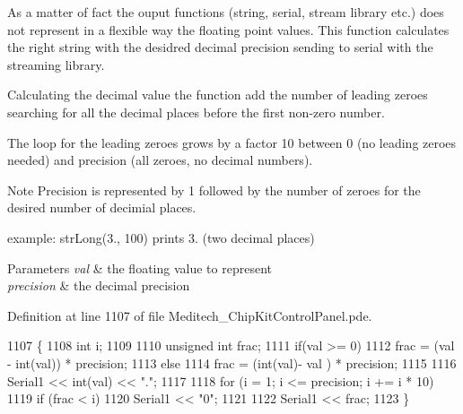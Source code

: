 \begin{DoxyCode}
\begin{DoxyCode}
\begin{DoxyCode}
\begin{DoxyCode}
As a matter of fact the ouput functions (string, serial, stream library etc.) does not represent in a flexible way the floating point values. This function calculates the right string with the desidred decimal precision sending to serial with the streaming library.

Calculating the decimal value the function add the number of leading zeroes searching for all the decimal places before the first non-\/zero number.

The loop for the leading zeroes grows by a factor 10 between 0 (no leading zeroes needed) and precision (all zeroes, no decimal numbers).

\begin{DoxyNote}{Note}
Precision is represented by 1 followed by the number of zeroes for the desired number of decimial places. \par
example\-: str\-Long(3., 100) prints 3. (two decimal places)
\end{DoxyNote}

\begin{DoxyParams}{Parameters}
{\em val} & the floating value to represent \\
\hline
{\em precision} & the decimal precision \\
\hline
\end{DoxyParams}


Definition at line 1107 of file Meditech\-\_\-\-Chip\-Kit\-Control\-Panel.\-pde.


\begin{DoxyCode}
1107                                                  \{
1108     \textcolor{keywordtype}{int} i;
1109     
1110     \textcolor{keywordtype}{unsigned} \textcolor{keywordtype}{int} frac;
1111     \textcolor{keywordflow}{if}(val >= 0)
1112       frac = (val - int(val)) * precision;
1113     \textcolor{keywordflow}{else}
1114       frac = (int(val)- val ) * precision;
1115 
1116     Serial1 << int(val) << \textcolor{stringliteral}{"."};
1117 
1118     \textcolor{keywordflow}{for} (i = 1; i <= precision; i += i * 10)
1119         \textcolor{keywordflow}{if} (frac < i)
1120             Serial1 << \textcolor{stringliteral}{"0"};
1121 
1122     Serial1 << frac;
1123 \}
\end{DoxyCode}
\hypertarget{_meditech___chip_kit_control_panel_8pde_a586164a6eff90eab6ba87a6ca123770d}{
}
\end{DoxyCode}
\end{DoxyCode}
\end{DoxyCode}
\end{DoxyCode}
